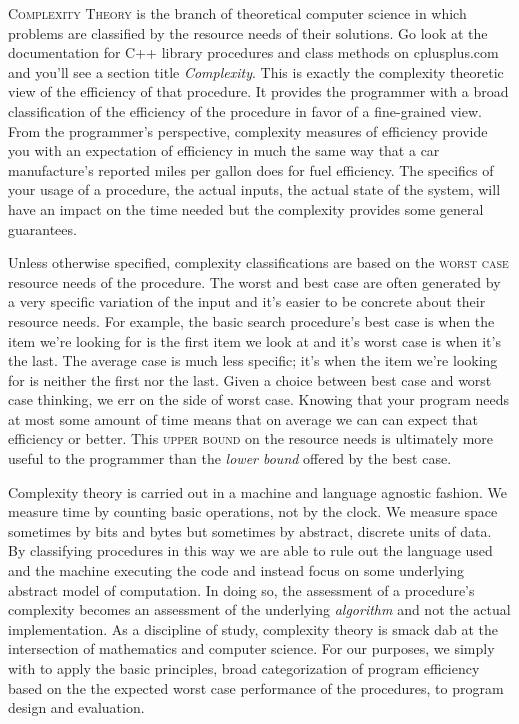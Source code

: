 \documentclass[]{tufte-handout}
\begin{document}
\textsc{Complexity Theory} is the branch of theoretical computer science in which problems are classified by the resource needs of their solutions.  Go look at the documentation for C++ library procedures and class methods on cplusplus.com and you'll see a section title \textit{Complexity}.  This is exactly the complexity theoretic view of the efficiency of that procedure. It provides the programmer with a broad classification of the efficiency of the procedure in favor of a fine-grained view. From the programmer's perspective, complexity measures of efficiency provide you with an expectation of efficiency in much the same way that a car manufacture's reported miles per gallon does for fuel efficiency. The specifics of your usage of a procedure, the actual inputs, the actual state of the system, will have an impact on the time needed but the complexity provides some general guarantees.

Unless otherwise specified, complexity classifications are based on the \textsc{worst case} resource needs of the procedure. The worst and best case are often generated by a very specific variation of the input and it's easier to be concrete about their resource needs. For example, the basic search procedure's best case is when the item we're looking for is the first item we look at and it's worst case is when it's the last. The average case is much less specific; it's when the item we're looking for is neither the first nor the last.  Given a choice between best case and worst case thinking, we err on the side of worst case.  Knowing that your program needs at most some amount of time means that on average we can can expect that efficiency or better.  This \textsc{upper bound} on the resource needs is ultimately more useful to the programmer than the \textit{lower bound} offered by the best case.

Complexity theory is carried out in a machine and language agnostic fashion. We measure time by counting basic operations, not by the clock. We measure space sometimes by bits and bytes but sometimes by abstract, discrete units of data. By classifying procedures in this way we are able to rule out the language used and the machine executing the code and instead focus on some underlying abstract model of computation. In doing so, the assessment of a procedure's complexity becomes an assessment of the underlying \textit{algorithm} and not the actual implementation. As a discipline of study, complexity theory is smack dab at the intersection of mathematics and computer science. For our purposes, we simply with to apply the basic principles, broad categorization of program efficiency based on the the expected worst case performance of the procedures, to program design and evaluation.
\end{document}
